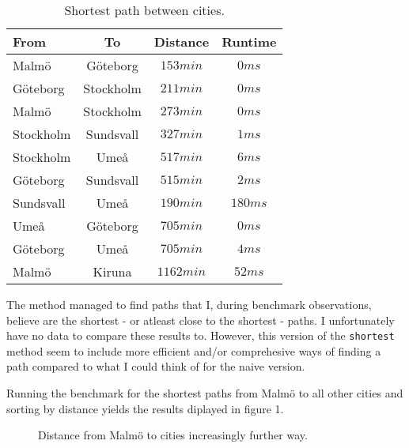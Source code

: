 \documentclass[a4paper,11pt]{article}
\begin{document}
\begin{table}[ht]
  \begin{center}
  \begin{tabular}{l|c|c|c}
  \textbf{From} & \textbf{To} & \textbf{Distance} & \textbf{Runtime} \\
  \hline
  Malmö         & Göteborg    & $153 min$   & $0 ms$    \\
  Göteborg      & Stockholm   & $211 min$   & $0 ms$    \\
  Malmö         & Stockholm   & $273 min$   & $0 ms$    \\
  Stockholm     & Sundsvall   & $327 min$   & $1 ms$    \\
  Stockholm     & Umeå        & $517 min$   & $6 ms$    \\
  Göteborg      & Sundsvall   & $515 min$   & $2 ms$    \\
  Sundsvall     & Umeå        & $190 min$   & $180 ms$  \\
  Umeå          & Göteborg    & $705 min$   & $0 ms$    \\
  Göteborg      & Umeå        & $705 min$   & $4 ms$    \\
  Malmö         & Kiruna      & $1162 min$  & $52 ms$   \\
  \end{tabular}
  \caption{Shortest path between cities.}
  \label{tab:table1}
  \end{center}
\end{table}

The method managed to find paths that I, during benchmark observations,
believe are the shortest - or atleast close to the shortest - paths. 
I unfortunately have no data to compare these results to. However, this 
version of the {\tt shortest} method seem to include more efficient and/or
comprehesive ways of finding a path compared to what I could think of for
the naive version.

Running the benchmark for the shortest paths from Malmö to all other
cities and sorting by distance yields the results diplayed in figure 1.

\begin{figure}[ht!]
  \centering
  \caption{Distance from Malmö to cities increasingly further way.}
  \label{fig:plot1}
\end{figure}
\end{document}
